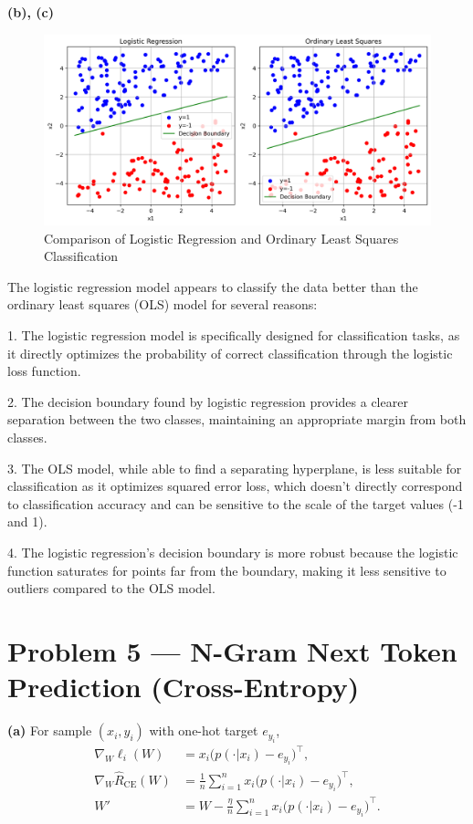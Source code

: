 \documentclass[11pt]{article}
\begin{document}
\noindent\textbf{(b), (c)}

\begin{figure}[H]
  \centering
  \includegraphics[width=0.9\linewidth]{4-c-output.png}
  \caption{Comparison of Logistic Regression and Ordinary Least Squares Classification}
  \label{fig:logistic-vs-ols}
\end{figure}

The logistic regression model appears to classify the data better than the ordinary least squares (OLS) model for several reasons:

1. The logistic regression model is specifically designed for classification tasks, as it directly optimizes the probability of correct classification through the logistic loss function.

2. The decision boundary found by logistic regression provides a clearer separation between the two classes, maintaining an appropriate margin from both classes.

3. The OLS model, while able to find a separating hyperplane, is less suitable for classification as it optimizes squared error loss, which doesn't directly correspond to classification accuracy and can be sensitive to the scale of the target values (-1 and 1).

4. The logistic regression's decision boundary is more robust because the logistic function saturates for points far from the boundary, making it less sensitive to outliers compared to the OLS model.

\section*{Problem 5 --- N-Gram Next Token Prediction (Cross-Entropy)}

\noindent\textbf{(a)} For sample $(x_i,y_i)$ with one-hot target $e_{y_i}$,
\begin{align*}
\nabla_W \ell_i(W) &= x_i\big(p(\cdot|x_i)-e_{y_i}\big)^\top, \\
\nabla_W \hat R_{\mathrm{CE}}(W) &= \frac1n \sum_{i=1}^n x_i\big(p(\cdot|x_i)-e_{y_i}\big)^\top, \\
W' &= W - \frac{\eta}{n} \sum_{i=1}^n x_i\big(p(\cdot|x_i)-e_{y_i}\big)^\top.
\end{align*}
\end{document}
